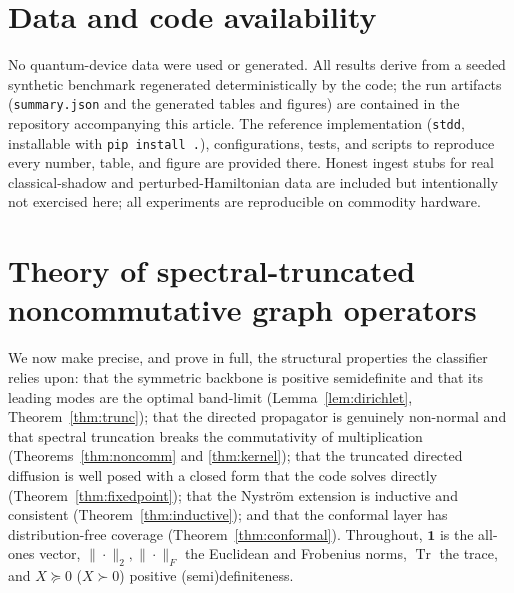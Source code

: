 \documentclass[aps,prresearch,reprint,amsmath,amssymb,nofootinbib,superscriptaddress,floatfix]{revtex4-2}
\theoremstyle{definition}
\theoremstyle{remark}
\theoremstyle{plain}
\begin{document}
\section*{Data and code availability}
No quantum-device data were used or generated. All results derive from a seeded synthetic benchmark
regenerated deterministically by the code; the run artifacts (\texttt{summary.json} and the generated
tables and figures) are contained in the repository accompanying this article. The reference implementation
(\texttt{stdd}, installable with \texttt{pip install .}), configurations, tests, and scripts to
reproduce every number, table, and figure are provided there. Honest ingest stubs for real classical-shadow
and perturbed-Hamiltonian data are included but intentionally not exercised here; all experiments are
reproducible on commodity hardware.

\appendix

\section{Theory of spectral-truncated noncommutative graph operators}
\label{sec:theory}
We now make precise, and prove in full, the structural properties the classifier relies upon: that the
symmetric backbone is positive semidefinite and that its leading modes are the optimal band-limit
(Lemma~\ref{lem:dirichlet}, Theorem~\ref{thm:trunc}); that the directed propagator is genuinely non-normal
and that spectral truncation breaks the commutativity of multiplication (Theorems~\ref{thm:noncomm} and
\ref{thm:kernel}); that the truncated directed diffusion is well posed with a closed form that the code
solves directly (Theorem~\ref{thm:fixedpoint}); that the Nystr\"om extension is inductive and consistent
(Theorem~\ref{thm:inductive}); and that the conformal layer has distribution-free coverage
(Theorem~\ref{thm:conformal}). Throughout, $\mathbf{1}$ is the all-ones vector,
$\|\cdot\|_2,\|\cdot\|_F$ the Euclidean and Frobenius norms, $\operatorname{Tr}$ the trace, and
$X\succeq0$ ($X\succ0$) positive (semi)definiteness.
\end{document}

